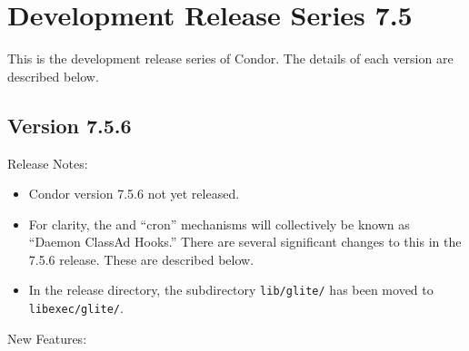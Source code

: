 
\section{\label{sec:History-7-5}Development Release Series 7.5}

This is the development release series of Condor.
The details of each version are described below.

\subsection*{\label{sec:New-7-5-6}Version 7.5.6}

\noindent Release Notes:

\begin{itemize}

\item Condor version 7.5.6 not yet released.

\item For clarity, the  and  ``cron''
  mechanisms will collectively be known as ``Daemon ClassAd
  Hooks.''  There are several significant changes to this in the 7.5.6
  release.  These are described below.

\item In the release directory, the subdirectory \verb|lib/glite/| has
  been moved to \verb|libexec/glite/|.

\end{itemize}


\noindent New Features:

